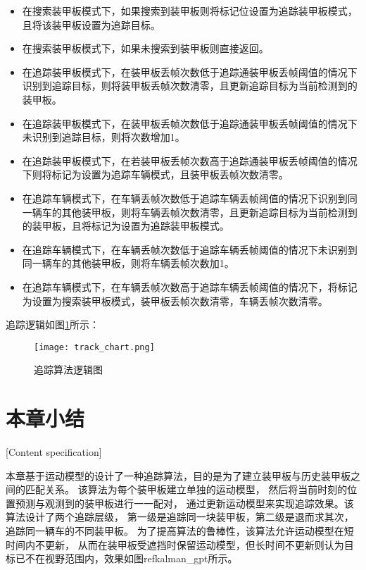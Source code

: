 \begin{itemize}[itemindent=2em]
\item 在搜索装甲板模式下，如果搜索到装甲板则将标记位设置为追踪装甲板模式，且将该装甲板设置为追踪目标。
\item 在搜索装甲板模式下，如果未搜索到装甲板则直接返回。
\item 在追踪装甲板模式下，在装甲板丢帧次数低于追踪通装甲板丢帧阈值的情况下识别到追踪目标，则将装甲板丢帧次数清零，且更新追踪目标为当前检测到的装甲板。
\item 在追踪装甲板模式下，在装甲板丢帧次数低于追踪通装甲板丢帧阈值的情况下未识别到追踪目标，则将次数增加1。
\item 在追踪装甲板模式下，在若装甲板丢帧次数高于追踪通装甲板丢帧阈值的情况下则将标记为设置为追踪车辆模式，且装甲板丢帧次数清零。
\item 在追踪车辆模式下，在车辆丢帧次数低于追踪车辆丢帧阈值的情况下识别到同一辆车的其他装甲板，则将车辆丢帧次数清零，且更新追踪目标为当前检测到的装甲板，且将标记为设置为追踪装甲板模式。
\item 在追踪车辆模式下，在车辆丢帧次数低于追踪车辆丢帧阈值的情况下未识别到同一辆车的其他装甲板，则将车辆丢帧次数加1。
\item 在追踪车辆模式下，在车辆丢帧次数高于追踪车辆丢帧阈值的情况下，将标记为设置为搜索装甲板模式，装甲板丢帧次数清零，车辆丢帧次数清零。
\end{itemize}

追踪逻辑如图\ref{追踪算法逻辑图}所示：

\begin{figure}[H]
    \centering
    \texttt{[image: track\_chart.png]} 
    \caption{追踪算法逻辑图} 
    \label{追踪算法逻辑图} 
\end{figure} 

\par


\section{本章小结}[Content specification]


本章基于运动模型的设计了一种追踪算法，目的是为了建立装甲板与历史装甲板之间的匹配关系。
该算法为每个装甲板建立单独的运动模型，
然后将当前时刻的位置预测与观测到的装甲板进行一一配对，
通过更新运动模型来实现追踪效果。该算法设计了两个追踪层级，
第一级是追踪同一块装甲板，第二级是退而求其次，追踪同一辆车的不同装甲板。
为了提高算法的鲁棒性，该算法允许运动模型在短时间内不更新，
从而在装甲板受遮挡时保留运动模型，但长时间不更新则认为目标已不在视野范围内，效果如图ref{kalman_gpt}所示。

